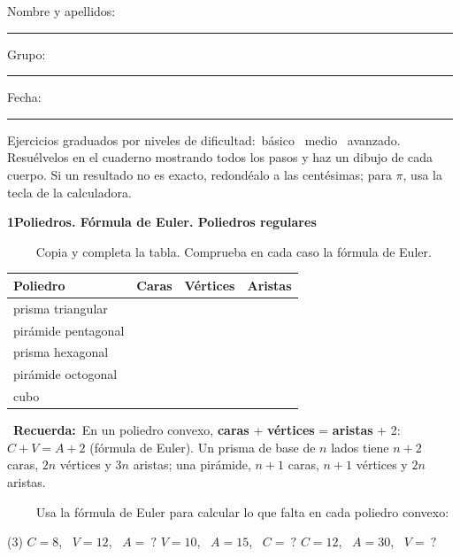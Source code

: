 \documentclass[11pt,a4paper]{article}
\newcommand{\estrelles}[1]{{\color{accent}\ifcase#1\or\faStar\faStar[regular]\faStar[regular]\or\faStar\faStar\faStar[regular]\or\faStar\faStar\faStar\fi}}
\newcounter{exer}
\newcommand{\ex}[1]{\par\needspace{4\baselineskip}\medskip\stepcounter{exer}\noindent{\color{navy}\bfseries\theexer.}\ \ {\small\estrelles{#1}}\ \ }
\newcommand{\seccio}[2]{\par\needspace{10\baselineskip}\bigskip
  \begin{tcolorbox}[colback=navy,colframe=navy,coltext=white,arc=2mm,boxrule=0pt,left=3mm,right=3mm,top=1.2mm,bottom=1.2mm]
  {\large\bfseries #1\quad #2}
  \end{tcolorbox}\vspace{-2pt}}
\newcommand{\recorda}[1]{\par\smallskip\begin{tcolorbox}[colback=accent!7,colframe=accent!55,arc=2mm,boxrule=0.5pt,left=2.5mm,right=2.5mm,top=1mm,bottom=1mm]\small{\color{accent}\faLightbulb[regular]}\ \textbf{Recuerda:}\ #1\end{tcolorbox}}
\begin{document}
\thispagestyle{primera}

\vspace{10pt}
Nombre y apellidos: \rule{6.6cm}{0.4pt}\hfill Grupo: \rule{1.6cm}{0.4pt}\hfill Fecha: \rule{2.2cm}{0.4pt}
\vspace{8pt}

\begin{tcolorbox}[colback=soft,colframe=soft,arc=2mm,left=3mm,right=3mm,top=1.5mm,bottom=1.5mm]
\small Ejercicios graduados por niveles de dificultad:\quad \estrelles{1}\ básico \qquad \estrelles{2}\ medio \qquad \estrelles{3}\ avanzado.\\[2pt] Resuélvelos en el cuaderno mostrando todos los pasos y haz un dibujo de cada cuerpo. Si un resultado no es exacto, redondéalo a las centésimas; para $\pi$, usa la tecla de la calculadora.
\end{tcolorbox}

\seccio{1}{Poliedros. Fórmula de Euler. Poliedros regulares}

\ex{1} Copia y completa la tabla. Comprueba en cada caso la fórmula de Euler.\par\smallskip\begin{center}\renewcommand{\arraystretch}{1.25}\begin{tabular}{|l|C{1.6cm}|C{1.6cm}|C{1.6cm}|}\hline Poliedro & Caras & Vértices & Aristas \\\hline prisma triangular & & &  \\\hline pirámide pentagonal & & &  \\\hline prisma hexagonal & & &  \\\hline pirámide octogonal & & &  \\\hline cubo & & &  \\\hline\end{tabular}\end{center}\recorda{En un poliedro convexo, \textbf{caras} + \textbf{vértices} = \textbf{aristas} + 2: \ $C+V=A+2$ (fórmula de Euler). Un prisma de base de $n$ lados tiene $n+2$ caras, $2n$ vértices y $3n$ aristas; una pirámide, $n+1$ caras, $n+1$ vértices y $2n$ aristas.}

\ex{1} Usa la fórmula de Euler para calcular lo que falta en cada poliedro convexo:\begin{tasks}(3)
  \task $C=8$, \ $V=12$, \ $A=\ ?$
  \task $V=10$, \ $A=15$, \ $C=\ ?$
  \task $C=12$, \ $A=30$, \ $V=\ ?$
\end{tasks}
\end{document}
